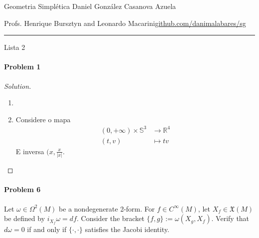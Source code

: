 


\usepackage[style=authortitle-terse,backend=bibtex]{biblatex}




\begin{minipage}{\textwidth}
	\begin{minipage}{1\textwidth}
		Geometria Simpl\'etica \hfill Daniel González Casanova Azuela
		
		{\small Profs. Henrique Bursztyn and Leonardo Macarini\hfill\href{https://github.com/danimalabares/sg}{github.com/danimalabares/sg}}
	\end{minipage}
\end{minipage}\vspace{.2cm}\hrule

\vspace{10pt}
{\huge Lista 2}

\paragraph{Problem 1} 

\begin{proof}[Solution]\leavevmode
	\begin{enumerate}[label=\alph*.]
		\item 

		\item Considere o mapa
			\begin{align*}
				(0,+\infty)\times \mathbb{S}^3 &\longrightarrow \mathbb{R}^4 \\
				(t,v) &\longmapsto tv
			\end{align*}
			E inversa $(x,\frac{x}{|x|}$.
	\end{enumerate}
\end{proof}

\paragraph{Problem 6} Let $\omega\in\Omega^2(M)$ be a nondegenerate 2-form. For $f\in C^\infty(M)$, let $X_f\in\mathfrak{X}(M)$ be defined by $i_{X_{f}}\omega=df$. Consider the bracket $\{f,g\}:=\omega(X_g,X_f)$. Verify that $d\omega=0$ if and only if $\{\cdot ,\cdot \}$ satisfies the Jacobi identity.

